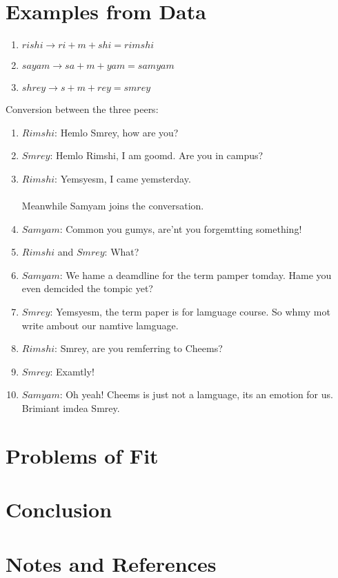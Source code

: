 \documentclass{article}
\begin{document}
    \section{Examples from Data}
    \begin{enumerate}
        \item $rishi \rightarrow ri+m+shi = rimshi$
        \item $sayam \rightarrow sa+m+yam = samyam$
        \item $shrey \rightarrow s+m+rey = smrey$
    \end{enumerate}
    Conversion between the three peers:
    \begin{enumerate}
        \item $Rimshi$: Hemlo Smrey, how are you?
        \item $Smrey$: Hemlo Rimshi, I am goomd. Are you in campus?
        \item $Rimshi$: Yemsyesm, I came yemsterday. \\
        \\
        Meanwhile Samyam joins the conversation.
        \item $Samyam$: Common you gumys, are'nt you forgemtting something!
        \item $Rimshi$ and $Smrey$: What?
        \item $Samyam$: We hame a deamdline for the term pamper tomday. Hame you even demcided the tompic yet?
        \item $Smrey$: Yemsyesm, the term paper is for lamguage course. So whmy mot write ambout our namtive lamguage.
        \item $Rimshi$: Smrey, are you remferring to Cheems?
        \item $Smrey$: Examtly!
        \item $Samyam$: Oh yeah! Cheems is just not a lamguage, its an emotion for us. Brimiant imdea Smrey.
    \end{enumerate}

    \section{Problems of Fit}

    \section{Conclusion}

    \section{Notes and References}
\end{document}
